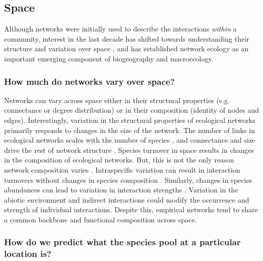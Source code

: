 \subsection{Space}\label{space}

Although networks were initially used to describe the interactions
\emph{within} a community, interest in the last decade has shifted
towards understanding their structure and variation over space
\cite{Trojelsgaard2016EcoNet, Baiser2019EcoRul}, and has established
network ecology as an important emerging component of biogeography and
macroecology.

\subsubsection{How much do networks vary over
space?}\label{how-much-do-networks-vary-over-space}

Networks can vary across space either in their structural properties
(e.g. connectance or degree distribution) or in their composition
(identity of nodes and edges). Interestingly, variation in the
structural properties of ecological networks primarily responds to
changes in the size of the network. The number of links in ecological
networks scales with the number of species \cite{MacDonald2020RevLin,
Brose2004UniSpa}, and connectance and size drive the rest of network
structure \cite{Poisot2014WheEco, Dunne2002FooStr, Riede2010ScaFoo}.
Species turnover in space results in changes in the composition of
ecological networks. But, this is not the only reason network
composition varies \cite{Poisot2015SpeWhy}. Intraspecific variation can
result in interaction turnovers without changes in species composition
\cite{Bolnick2011WhyInt}. Similarly, changes in species abundances can
lead to variation in interaction strengths \cite{Canard2014EmpEva,
Vazquez2007SpeAbu}. Variation in the abiotic environment and indirect
interactions \cite{Golubski2016EcoNet} could modify the occurrence and
strength of individual interactions. Despite this, empirical networks
tend to share a common backbone \cite{Mora2018IdeCom} and functional
composition \cite{Dehling2020SimCom} across space.

\subsubsection{How do we predict what the species pool at a particular
location
is?}\label{how-do-we-predict-what-the-species-pool-at-a-particular-location-is}

